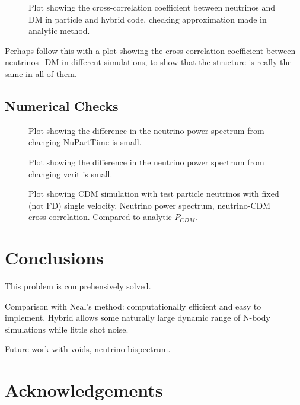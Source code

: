 \documentclass[useAMS, usenatbib]{mnras}
\begin{document}
\begin{figure}
  \caption{Plot showing the cross-correlation coefficient between neutrinos
  and DM in particle and hybrid code, checking approximation made in analytic method.}
  \label{fig:cross-corr}
\end{figure}

Perhaps follow this with a plot showing the cross-correlation coefficient between neutrinos+DM
in different simulations, to show that the structure is really the same in all of them.


\subsection{Numerical Checks}

\begin{figure}
  \caption{Plot showing the difference in the neutrino power spectrum from changing NuPartTime is small. }
  \label{fig:nuparttime}
\end{figure}

\begin{figure}
  \caption{Plot showing the difference in the neutrino power spectrum from changing vcrit is small. }
  \label{fig:vcrit}
\end{figure}

\begin{figure}
    \caption{Plot showing CDM simulation with test particle neutrinos with fixed (not FD) single velocity.
  Neutrino power spectrum, neutrino-CDM cross-correlation. Compared to analytic $P_{CDM}$.}
  \label{fig:testpart}
\end{figure}


\section{Conclusions}
\label{sec:conclusion}

This problem is comprehensively solved.

Comparison with Neal's method:
computationally efficient and easy to implement.
Hybrid allows some naturally large dynamic range of N-body simulations while little shot noise.

Future work with voids, neutrino bispectrum.

\section*{Acknowledgements}

\appendix
\end{document}
